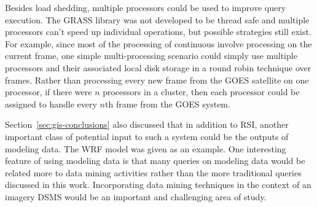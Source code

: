 \documentclass{ucdthesis}       %
\begin{document}
Besides load shedding, multiple processors could be used to improve
query execution.  The \ac{GRASS} library was not developed to be
thread safe and multiple processors can't speed up individual
operations, but possible strategies still exist.  For example, since
most of the processing of continuous involve processing on the current
frame, one simple multi-processing scenario could simply use multiple
processors and their associated local disk storage in a round robin
technique over frames.  Rather than processing every new frame from
the \ac{GOES} satellite on one processor, if there were $n$ processors
in a cluster, then each processor could be assigned to handle every
$n$th frame from the \ac{GOES} system.

Section~\ref{sec:gis-conclusions} also discussed that in addition to
\ac{RSI}, another important class of potential input to such a system
could be the outputs of modeling data.  The \acf{WRF} model was given
as an example.  One interesting feature of using modeling data is that
many queries on modeling data would be related more to data mining
activities rather than the more traditional queries discussed in this
work.  Incorporating data mining techniques in the context of an
imagery \ac{DSMS} would be an important and challenging area of study.





\end{document}
